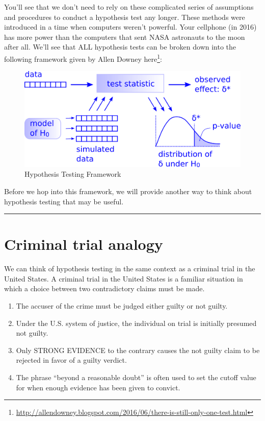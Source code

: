\documentclass[12pt,]{krantz}
\renewcommand{\href}[2]{#2\footnote{\url{#1}}}
\theoremstyle{definition}
\theoremstyle{definition}
\theoremstyle{definition}
\theoremstyle{remark}
\begin{document}
You'll see that we don't need to rely on these complicated series of
assumptions and procedures to conduct a hypothesis test any longer.
These methods were introduced in a time when computers weren't powerful.
Your cellphone (in 2016) has more power than the computers that sent
NASA astronauts to the moon after all. We'll see that ALL hypothesis
tests can be broken down into the following framework given by Allen
Downey
\href{http://allendowney.blogspot.com/2016/06/there-is-still-only-one-test.html}{here}:

\begin{figure}

{\centering \includegraphics[width=\textwidth]{images/ht} 

}

\caption{Hypothesis Testing Framework}\label{fig:htdowney}
\end{figure}

Before we hop into this framework, we will provide another way to think
about hypothesis testing that may be useful.

\begin{center}\rule{0.5\linewidth}{\linethickness}\end{center}

\section{Criminal trial analogy}\label{trial}

We can think of hypothesis testing in the same context as a criminal
trial in the United States. A criminal trial in the United States is a
familiar situation in which a choice between two contradictory claims
must be made.

\begin{enumerate}
\def\labelenumi{\arabic{enumi}.}
\item
  The accuser of the crime must be judged either guilty or not guilty.
\item
  Under the U.S. system of justice, the individual on trial is initially
  presumed not guilty.
\item
  Only STRONG EVIDENCE to the contrary causes the not guilty claim to be
  rejected in favor of a guilty verdict.
\item
  The phrase ``beyond a reasonable doubt'' is often used to set the
  cutoff value for when enough evidence has been given to convict.
\end{enumerate}
\end{document}

